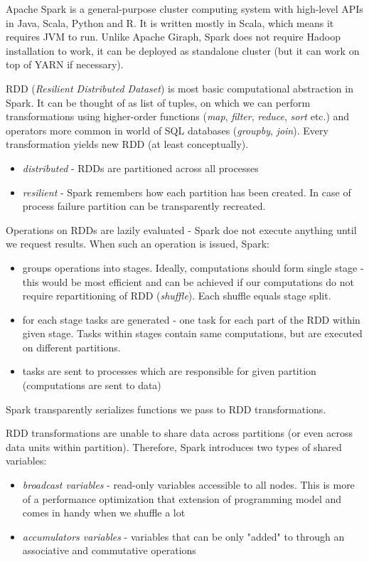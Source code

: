 Apache Spark is a general-purpose cluster computing system with high-level APIs in Java, Scala, Python and R. It is written mostly in Scala, which means it requires JVM to run. Unlike Apache Giraph, Spark does not require Hadoop installation to work, it can be deployed as standalone cluster (but it can work on top of YARN if necessary).

\noindent
RDD (\textit{Resilient Distributed Dataset}) is most basic computational abstraction in Spark. It can be thought of as list of tuples, on which we can perform transformations using higher-order functions (\textit{map}, \textit{filter}, \textit{reduce}, \textit{sort} etc.) and operators more common in world of SQL databases (\textit{groupby}, \textit{join}). Every transformation yields new RDD (at least conceptually).
\begin{itemize}
    \item \textit{distributed} - RDDs are partitioned across all processes
    \item \textit{resilient} - Spark remembers how each partition has been created. In case of process failure partition can be transparently recreated.
\end{itemize}

\noindent
Operations on RDDs are lazily evaluated - Spark doe not execute anything until we request results. When such an operation is issued, Spark:
\begin{itemize}
\item groups operations into stages. Ideally, computations should form single stage - this would be most efficient and can be achieved if our computations do not require repartitioning of RDD (\textit{shuffle}). Each shuffle equals stage split.
    \item for each stage tasks are generated - one task for each part of the RDD within given stage. Tasks within stages contain same computations, but are executed on different partitions.
    \item tasks are sent to processes which are responsible for given partition (computations are sent to data)
\end{itemize}
Spark transparently serializes functions we pass to RDD transformations.

\noindent
RDD transformations are unable to share data across partitions (or even across data units within partition). Therefore, Spark introduces two types of shared variables:
\begin{itemize}
    \item \textit{broadcast variables} - read-only variables accessible to all nodes. This is more of a performance optimization that extension of programming model and comes in handy when we shuffle a lot
    \item \textit{accumulators variables} - variables that can be only "added" to through an associative and commutative operations
\end{itemize}

